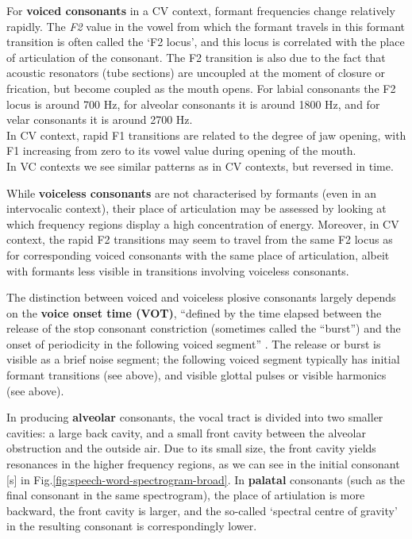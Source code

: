 \documentclass[
]{book}
\begin{document}
For \textbf{voiced consonants} in a CV context, formant frequencies change relatively rapidly. The \emph{F2} value in the vowel from which the formant travels in this formant transition is often called the `F2 locus', and this locus is correlated with the place of articulation of the consonant. The F2 transition is also due to the fact that acoustic resonators (tube sections) are uncoupled at the moment of closure or frication, but become coupled as the mouth opens.
For labial consonants the F2 locus is around 700 Hz, for alveolar consonants it is around 1800 Hz, and for velar consonants it is around 2700 Hz.\\
In CV context, rapid F1 transitions are related to the degree of jaw opening, with F1 increasing from zero to its vowel value during opening of the mouth.\\
In VC contexts we see similar patterns as in CV contexts, but reversed in time.

While \textbf{voiceless consonants} are not characterised by formants (even in an intervocalic context), their place of articulation may be assessed by looking at which frequency regions display a high concentration of energy. Moreover, in CV context, the rapid F2 transitions may seem to travel from the same F2 locus as for corresponding voiced consonants with the same place of articulation, albeit with formants less visible in transitions involving voiceless consonants.

The distinction between voiced and voiceless plosive consonants largely depends on the \textbf{voice onset time (VOT)}, ``defined by the time elapsed between the release of the stop consonant constriction (sometimes called the ``burst'') and the onset of periodicity in the following voiced segment'' \citep{Rubin_2022}. The release or burst is visible as a brief noise segment; the following voiced segment typically has initial formant transitions (see above), and visible glottal pulses or visible harmonics (see above).

In producing \textbf{alveolar} consonants, the vocal tract is divided into two smaller cavities: a large back cavity, and a small front cavity between the alveolar obstruction and the outside air. Due to its small size, the front cavity yields resonances in the higher frequency regions, as we can see in the initial consonant {[}s{]} in Fig.\ref{fig:speech-word-spectrogram-broad}. In \textbf{palatal} consonants (such as the final consonant in the same spectrogram), the place of artiulation is more backward, the front cavity is larger, and the so-called `spectral centre of gravity' in the resulting consonant is correspondingly lower.
\end{document}
